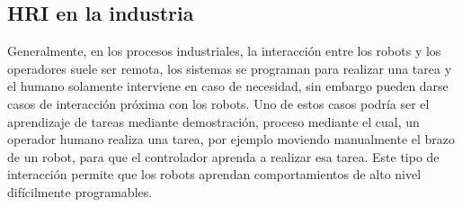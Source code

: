  \subsection{HRI en la industria}
 
 Generalmente, en los procesos industriales, la interacción entre los robots y los operadores suele ser remota, los sistemas se programan para realizar una tarea y el humano solamente interviene en caso de necesidad, sin embargo pueden darse casos de interacción próxima con los robots. Uno de estos casos podría ser el aprendizaje de tareas mediante demostración, proceso mediante el cual, un operador humano realiza una tarea, por ejemplo moviendo manualmente el brazo de un robot, para que el controlador aprenda a realizar esa tarea. Este tipo de interacción permite que los robots aprendan comportamientos de alto nivel difícilmente programables.
 
